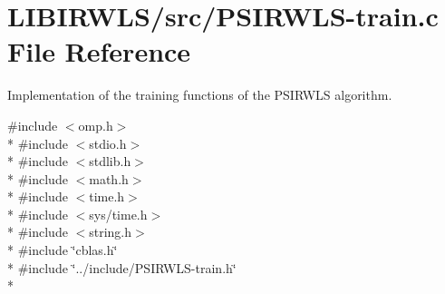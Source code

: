 \hypertarget{PSIRWLS-train_8c}{}\section{L\+I\+B\+I\+R\+W\+L\+S/src/\+P\+S\+I\+R\+W\+L\+S-\/train.c File Reference}
\label{PSIRWLS-train_8c}


Implementation of the training functions of the P\+S\+I\+R\+W\+LS algorithm.  


{\ttfamily \#include $<$omp.\+h$>$}\\*
{\ttfamily \#include $<$stdio.\+h$>$}\\*
{\ttfamily \#include $<$stdlib.\+h$>$}\\*
{\ttfamily \#include $<$math.\+h$>$}\\*
{\ttfamily \#include $<$time.\+h$>$}\\*
{\ttfamily \#include $<$sys/time.\+h$>$}\\*
{\ttfamily \#include $<$string.\+h$>$}\\*
{\ttfamily \#include \char`\"{}cblas.\+h\char`\"{}}\\*
{\ttfamily \#include \char`\"{}../include/\+P\+S\+I\+R\+W\+L\+S-\/train.\+h\char`\"{}}\\*
